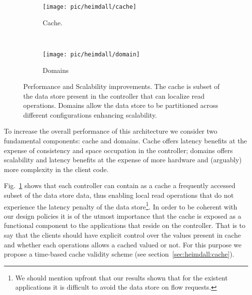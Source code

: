 \begin{figure}
  \centering
  \begin{subfigure}[b]{0.5\textwidth}
                \centering
                \texttt{[image: pic/heimdall/cache]}
                \caption{Cache. }
                \label{fig:heimdall:cache}
        \end{subfigure}%
        ~
        \begin{subfigure}[b]{0.5\textwidth}
                \centering
                \texttt{[image: pic/heimdall/domain]}
                \caption{Domains}
                \label{fig:heimdall:domains}
        \end{subfigure}
        \caption[Performance and Scalability.]{Performance and Scalability improvements. The cache is subset of the data store present in the controller that can localize read operations. Domains allow the data store to be  partitioned across different configurations enhancing scalability.}
        \label{fig:heimdall:cache-domains} 
\end{figure}

To increase the overall performance of this architecture we consider two fundamental components: cache and domains. Cache offers latency benefits at the expense of consistency and space occupation in the controller; domains offers scalability and latency benefits at the expense of more hardware and (arguably) more complexity in the client code. 

Fig.~\ref{fig:heimdall:cache} shows that each controller can contain as a cache a frequently accessed subset of the data store  data, thus enabling local read operations that do not experience the latency penalty of the data store\footnote{We should mention upfront that our results shown that for the existent applications it is difficult to avoid the data store on flow requests.}.
In order to be coherent with our design policies it is of the utmost importance that the cache is exposed as a functional component to the applications that reside on the controller. That is to say that the clients should have explicit control  over the values present in cache and whether each operations allows a cached valued or not. For this purpose we propose a time-based cache validity scheme (see section~\ref{sec:heimdall:cache}). 

